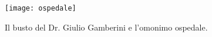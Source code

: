 \newpage

 \begin{figure}[htb]
    \centering
    \texttt{[image: ospedale]}
    \caption*{\label{fig:gamberini}Il busto del Dr. Giulio Gamberini e l'omonimo ospedale.}
\end{figure}

